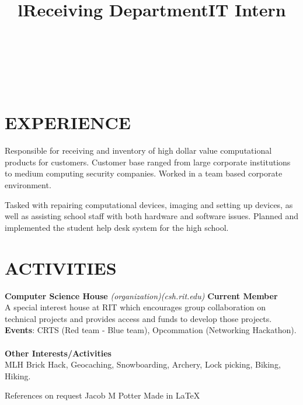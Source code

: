 \documentclass[line,margin]{res}
\begin{document}
\begin{resume}
\begin{format}
\title{l}\\
\\
\body\\
\end{format}
\section{EXPERIENCE}
\title{\textbf{Receiving Department}}
\begin{position}
    Responsible for receiving and inventory of high dollar value 
    computational products for customers. Customer base ranged from large 
    corporate institutions to medium computing security companies. Worked in a
    team based corporate environment.
\end{position}
\title{\textbf{IT Intern}}
\begin{position}
    Tasked with repairing computational devices, imaging and setting up devices, 
    as well as assisting school staff with both hardware and software issues. 
    Planned and implemented the student help desk system for the high 
    school.
\end{position}

\section{ACTIVITIES}
{\textbf{Computer Science House}}
{\sl (organization)}{\sl (csh.rit.edu)}\hfill
\textbf{Current Member}\\
A special interest house at RIT which encourages group collaboration on technical 
projects and provides access and funds to develop those projects.\\
\textbf{Events}: 
CRTS (Red team - Blue team), Opcommation (Networking Hackathon).\\\\
\textbf{Other Interests/Activities}\\
MLH Brick Hack, Geocaching, Snowboarding, Archery, Lock picking, Biking, Hiking.

\end{resume}
\scriptsize{References on request} \hfill 
\scriptsize{Jacob M Potter} \hfill 
\scriptsize{Made in \LaTeX}
\end{document}
